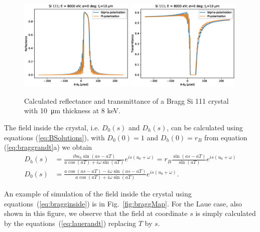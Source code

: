 \documentclass[preprint]{iucr}              %
\begin{document}
\begin{figure}\label{fig:braggProfiles}
    \centering
    \includegraphics[width=0.49\textwidth]{figures/Bragg_1.eps}
    \includegraphics[width=0.49\textwidth]{figures/Bragg_2.eps}
    \caption{Calculated reflectance and transmittance of a Bragg Si 111 crystal with \SI{10}{\micro\meter} thickness at 8 keV. }
\end{figure}

The field inside the crystal, i.e. $D_0(s)$ and $D_h(s)$, can be calculated using equations (\ref{eq:BSolutions}), with $D_0(0)=1$ and $D_h(0)=r_B$ from equation (\ref{eq:braggrandt}a) we obtain
\begin{subequations}\label{eq:bragginside}
\begin{align}
D_h(s)&=\frac{i b u_h \sin(as - aT)}{a \cos(aT) + i \omega \sin(aT)} e^{is(u_0+\omega)} 
= r_B \frac{\sin(as - aT)}{\sin(aT)} e^{is(u_0+\omega)}\\
D_0(s)&= \frac{a \cos(as-aT) - i \omega \sin(as-aT)}{a \cos(aT) + i \omega \sin(aT)} e^{is(u_0+\omega)}.
\end{align}
\end{subequations}

An example of simulation of the field inside the crystal using equations~(\ref{eq:bragginside}) is in Fig.~\ref{fig:braggMap}. For the Laue case, also shown in this figure, we observe that the field at coordinate $s$ is simply calculated by the equations~(\ref{eq:lauerandt}) replacing $T$ by $s$.
\end{document}
